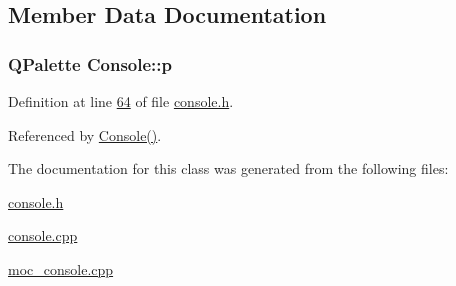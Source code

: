 \subsection{Member Data Documentation}
\hypertarget{a00002_a097b52858dc4b9f1bec8d8d67518daf0}{
\subsubsection[{p}]{\setlength{\rightskip}{0pt plus 5cm}Q\+Palette Console\+::p}}\label{a00002_a097b52858dc4b9f1bec8d8d67518daf0}


Definition at line \hyperlink{a00033_source_l00064}{64} of file \hyperlink{a00033_source}{console.\+h}.



Referenced by \hyperlink{a00032_source_l00049}{Console()}.



The documentation for this class was generated from the following files\+:\begin{DoxyCompactItemize}
\item 
\hyperlink{a00033}{console.\+h}\item 
\hyperlink{a00032}{console.\+cpp}\item 
\hyperlink{a00013}{moc\+\_\+console.\+cpp}\end{DoxyCompactItemize}

